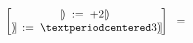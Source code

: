 \documentclass[oneside,12pt]{article}
\begin{document}
$$\scalebox{0.8}{$
  \ga{PBL} \bmat{
    \; |\!) \; := \; + 2 |\!) \;\; \\
    \rbparen \; := \; ·3 \rbparen \\
  } \;\;=\;\;
  \ga{PBL2}
  $}
$$


%
%
%
%






\newpage


\end{document}
